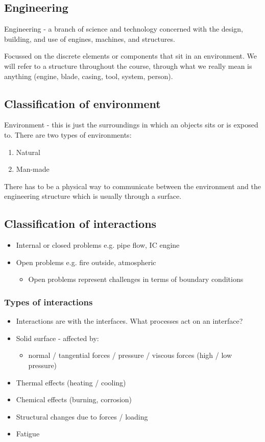 \subsection{Engineering}
Engineering - a branch of science and technology concerned with the design, building, and use of engines, machines, and structures.

Focussed on the discrete elements or components that sit in an environment. We will refer to a structure throughout the course, through what we really mean is anything (engine, blade, casing, tool, system, person).
\subsection{Classification of environment}
Environment - this is just the surroundings in which an objects sits or is exposed to. There are two types of environments:
\begin{enumerate}
    \item Natural
    \item Man-made
\end{enumerate}
There has to be a physical way to communicate between the environment and the engineering structure which is usually through a surface.
\subsection{Classification of interactions}
\begin{itemize}
    \item Internal or closed problems e.g. pipe flow, IC engine
    \item Open problems e.g. fire outside, atmospheric
          \begin{itemize}
              \item Open problems represent challenges in terms of boundary conditions
          \end{itemize}
\end{itemize}
\subsubsection{Types of interactions}
\begin{itemize}
    \item Interactions are with the interfaces. What processes act on an interface?
    \item Solid surface - affected by:
          \begin{itemize}
              \item normal / tangential forces / pressure / viscous forces (high / low pressure)
          \end{itemize}
    \item Thermal effects (heating / cooling)
    \item Chemical effects (burning, corrosion)
    \item Structural changes due to forces / loading
    \item Fatigue
\end{itemize}
